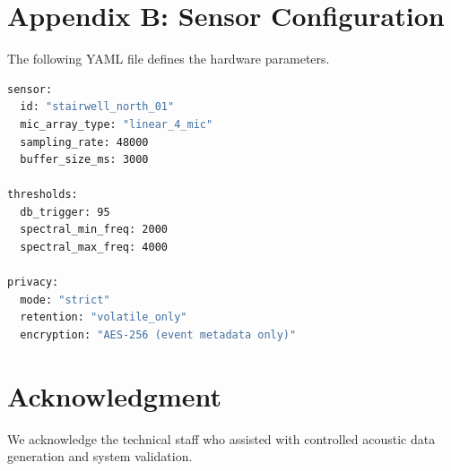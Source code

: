 \documentclass[conference]{IEEEtran}
\begin{document}
\section*{Appendix B: Sensor Configuration}
The following YAML file defines the hardware parameters.

\begin{lstlisting}[language=bash, caption=Sensor Config]
sensor:
  id: "stairwell_north_01"
  mic_array_type: "linear_4_mic"
  sampling_rate: 48000
  buffer_size_ms: 3000
    
thresholds:
  db_trigger: 95
  spectral_min_freq: 2000
  spectral_max_freq: 4000
    
privacy:
  mode: "strict"
  retention: "volatile_only"
  encryption: "AES-256 (event metadata only)"
\end{lstlisting}

\section*{Acknowledgment}
We acknowledge the technical staff who assisted with controlled acoustic data generation and system validation.
\end{document}

